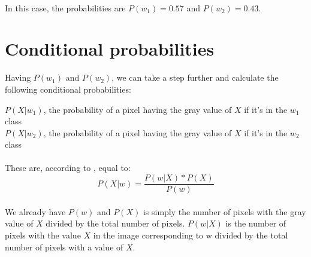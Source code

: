 \paragraph{}
In this case, the probabilities are $P(w_1) = 0.57$ and $P(w_2) = 0.43$.

\clearpage

\section{Conditional probabilities}
Having $P(w_1)$ and $P(w_2)$, we can take a step further and calculate the following conditional probabilities:
\begin{center}
    $P(X|w_1)$, the probability of a pixel having the gray value of $X$ if it's in the $w_1$ class
    \\
    $P(X|w_2)$, the probability of a pixel having the gray value of $X$ if it's in the $w_2$ class
\end{center}

\paragraph{}
These are, according to \cite{bayes_theorem}, equal to:
$$P(X|w) = \frac{P(w | X) * P(X)}{P(w)}$$

\paragraph{}
We already have $P(w)$ and $P(X)$ is simply the number of pixels with the gray value of $X$ divided by the total number of pixels.
$P(w | X)$ is the number of pixels with the value $X$ in the image corresponding to w divided by the total number of pixels with a value of $X$.

